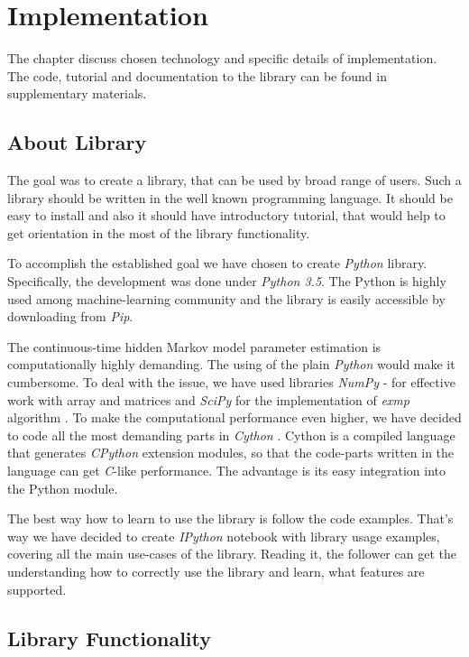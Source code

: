 \documentclass[thesis=M,english]{FITthesis}[2012/10/20]
\begin{document}
\chapter{Implementation}\label{ch:i}

The chapter discuss chosen technology and specific details of implementation. 
The code, tutorial and documentation to the library can be found in supplementary materials.

\section{About Library}

The goal was to create a library, that can be used by broad range of users. Such a library should be written in the well known programming language. It should be easy to install and also it should have introductory tutorial, that would help to get orientation in the most of the library functionality. 

To accomplish the established goal we have chosen to create \textit{Python} library. Specifically, the development was done under \textit{Python 3.5}. The Python is highly used among machine-learning community and the library is easily accessible by downloading from \textit{Pip}. %

The continuous-time hidden Markov model parameter estimation is computationally highly demanding. The using of the plain \textit{Python} would make it cumbersome. To deal with the issue, we have used libraries \textit{NumPy} - for effective work with array and matrices and \textit{SciPy} \cite{Sc01} for the implementation of \textit{exmp} algorithm \cite{Hi05}. To make the computational performance even higher, we have decided to code all the most demanding parts in \textit{Cython} \cite{Be10}. Cython is a compiled language that generates \textit{CPython} extension modules, so that the code-parts written in the language can get \textit{C}-like performance. The advantage is its easy integration into the Python module.

The best way how to learn to use the library is follow the code examples. That's way we have decided to create \textit{IPython} notebook with library usage examples, covering all the main use-cases of the library. Reading it, the follower can get the understanding how to correctly use the library and learn, what features are supported.          

\section{Library Functionality}
\end{document}
